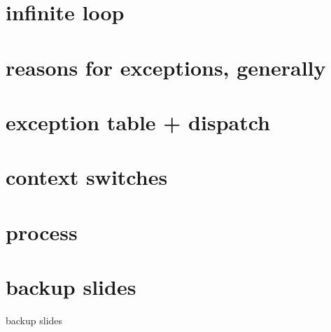 


\section{infinite loop}


\section{reasons for exceptions, generally}

\section{exception table + dispatch}

\section{context switches}

\section{process}

\section{backup slides}
\begin{frame}{backup slides}
\end{frame}


